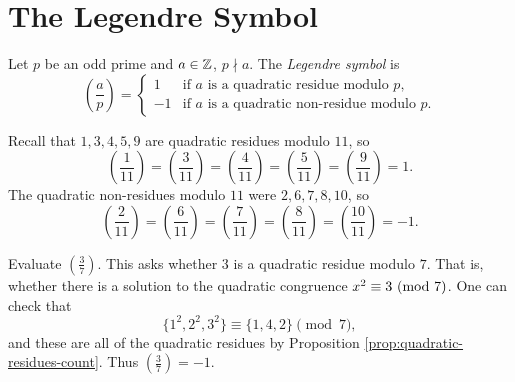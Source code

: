 \section{The Legendre Symbol}

\begin{definition}
  Let $p$ be an odd prime and
  $a \in \mathbb{Z}$, $p \nmid a$. The
  \emph{Legendre symbol} is
  \[
    \left(\frac{a}{p}\right)
    =
    \begin{cases}
      1 & \text{if $a$ is a quadratic residue modulo $p$,} \\
      -1 & \text{if $a$ is a quadratic non-residue modulo $p$.}
    \end{cases}
  \]
\end{definition}

\begin{example}
  Recall that $1, 3, 4, 5, 9$ are
  quadratic residues modulo $11$, so
  \[
    \left(\frac{1}{11}\right)
    = \left(\frac{3}{11}\right)
    = \left(\frac{4}{11}\right)
    = \left(\frac{5}{11}\right)
    = \left(\frac{9}{11}\right)
    = 1.
  \]
  The quadratic non-residues modulo
  $11$ were $2, 6, 7, 8, 10$, so
  \[
    \left(\frac{2}{11}\right)
    = \left(\frac{6}{11}\right)
    = \left(\frac{7}{11}\right)
    = \left(\frac{8}{11}\right)
    = \left(\frac{10}{11}\right)
    = -1.
  \]
\end{example}

\begin{example}
  Evaluate $\left(\frac{3}{7}\right)$.
  This asks whether $3$ is a quadratic
  residue modulo $7$. That is, whether
  there is a solution to the
  quadratic congruence
  $x^2 \equiv 3 \ (\mathrm{mod}\ 7)$. One can check
  that
  \[
    \{
      1^2, 2^2, 3^2
    \}
    \equiv \{1, 4, 2\} \pmod{7},
  \]
  and these are all of the quadratic
  residues by Proposition
  \ref{prop:quadratic-residues-count}.
  Thus $\left(\frac{3}{7}\right) = -1$.
\end{example}
